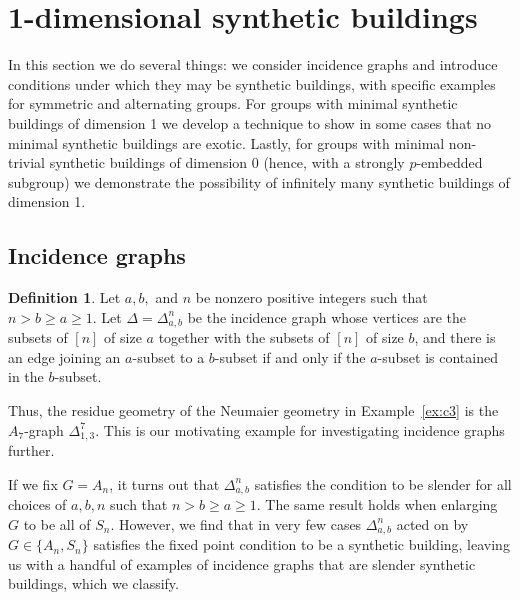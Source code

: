 \documentclass[12pt]{amsart}
\theoremstyle{plain}
\theoremstyle{definition}
\newtheorem{definition}[theorem]{Definition}
\theoremstyle{remark}
\numberwithin{equation}{section}
\begin{document}


\section{1-dimensional synthetic buildings}

In this section we do several things: we consider incidence graphs and introduce conditions under which they may be synthetic buildings, with specific examples for symmetric and alternating groups. For groups with minimal synthetic buildings of dimension 1 we develop a technique to show in some cases that no minimal synthetic buildings are exotic. Lastly, for groups with minimal non-trivial synthetic buildings of dimension 0 (hence, with a strongly $p$-embedded subgroup) we demonstrate the possibility of infinitely many synthetic buildings of dimension 1.


\subsection{Incidence graphs}
\label{incidence-graphs-subsection}

\begin{definition}
    Let $a,b,$ and $n$ be nonzero positive integers such that  $n>b\geq a\geq 1$. Let $\Delta=\Delta^n_{a,b}$ be the incidence graph whose vertices are the subsets of $[n]$ of size $a$ together with the subsets of $[n]$ of size $b$, and there is an edge joining an $a$-subset to a $b$-subset if and only if the $a$-subset is contained in the $b$-subset.
\end{definition}
Thus, the residue geometry of the Neumaier geometry in Example~\ref{ex:c3} is the $A_7$-graph $\Delta^7_{1,3}$. This is our motivating example for investigating incidence graphs further.

If we fix $G=A_n$, it turns out that $\Delta^n_{a,b}$
satisfies the condition to be slender for all choices of $a,b,n$ such that $n>b\geq a\geq 1$. The same result holds when enlarging $G$ to be all of $S_n$. However, we find that in very few cases $\Delta^n_{a,b}$ acted on by $G\in\{A_n,S_n\}$ satisfies the fixed point condition to be a synthetic building, leaving us with a handful of examples of incidence graphs that are slender synthetic buildings, which we classify.
\end{document}
